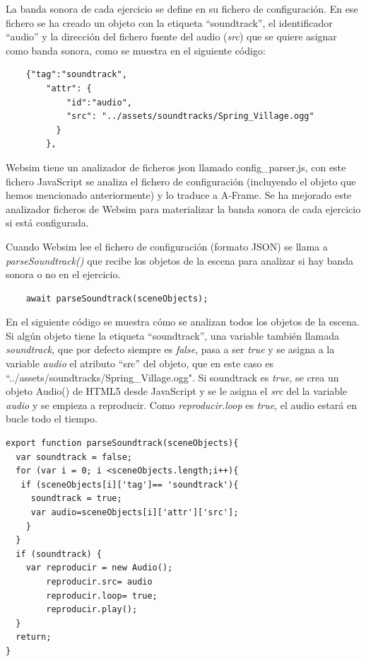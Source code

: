 La banda sonora de cada ejercicio se define en su fichero de configuración. En ese fichero se ha creado un objeto con la etiqueta ``soundtrack'', el identificador ``audio'' y la dirección del fichero fuente del audio (\textit{src}) que se quiere asignar como banda sonora, como se muestra en el siguiente código:

\begin{lstlisting}
 	{"tag":"soundtrack",
        "attr": {
            "id":"audio",
            "src": "../assets/soundtracks/Spring_Village.ogg"
          }
        },
   \end{lstlisting}

Websim tiene un analizador de ficheros json llamado config\_parser.js, con este fichero JavaScript se analiza el fichero de configuración (incluyendo el objeto que hemos mencionado anteriormente) y lo traduce a A-Frame. Se ha mejorado este analizador ficheros de Websim para materializar la banda sonora de cada ejercicio si está configurada.

Cuando Websim lee el fichero de configuración (formato JSON) se llama a \textit{parseSoundtrack()} que recibe los objetos de la escena para analizar si hay banda sonora o no en el ejercicio.

\begin{lstlisting}
 	await parseSoundtrack(sceneObjects);
\end{lstlisting}

En el siguiente código se muestra cómo se analizan todos los objetos de la escena. Si algún objeto tiene la etiqueta ``soundtrack'', una variable también llamada \textit{soundtrack}, que por defecto siempre es \textit{false}, pasa a ser \textit{true} y se asigna a la variable \textit{audio} el atributo  ``src'' del objeto,  que en este caso es  ``../assets/soundtracks/Spring\_Village.ogg".  
Si soundtrack es \textit{true}, se crea un objeto Audio() de HTML5 desde JavaScript y se le asigna el \textit{src} del la variable \textit{audio} y se empieza a reproducir. Como \textit{reproducir.loop} es \textit{true}, el audio estará en bucle todo el tiempo.

\begin{lstlisting}
export function parseSoundtrack(sceneObjects){
  var soundtrack = false;
  for (var i = 0; i <sceneObjects.length;i++){
   if (sceneObjects[i]['tag']== 'soundtrack'){
     soundtrack = true;
     var audio=sceneObjects[i]['attr']['src'];
    }
  }
  if (soundtrack) {
    var reproducir = new Audio();
        reproducir.src= audio
        reproducir.loop= true;
        reproducir.play();
  }
  return;
}
\end{lstlisting}

